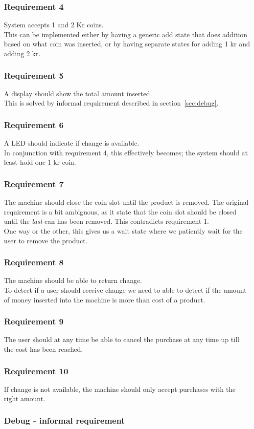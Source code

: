 \subsubsection*{Requirement 4}
System accepts 1 and 2 Kr coins.\\
This can be implemented either by having a generic add state that does addition based on what coin was inserted, or by having separate states for adding 1 kr and adding 2 kr.

\subsubsection*{Requirement 5}
A display should show the total amount inserted.\\
This is solved by informal requirement described in section~\ref{sec:debug}. 

\subsubsection*{Requirement 6}
A LED should indicate if change is available.\\
In conjunction with requirement 4, this effectively becomes; the system should at least hold one 1 kr coin. 

\subsubsection*{Requirement 7}
The machine should close the coin slot until the product is removed. The original requirement is a bit ambiguous, as it state that the coin slot should be closed until the \emph{last} can has been removed. This contradicts requirement 1.\\
One way or the other, this gives us a wait state where we patiently wait for the user to remove the product.

\subsubsection*{Requirement 8}
The machine should be able to return change.\\
To detect if a user should receive change we need to able to detect if the amount of money inserted into the machine is more than cost of a product.

\subsubsection*{Requirement 9}
The user should at any time be able to cancel the purchase at any time up till the cost has been reached.\\


\subsubsection*{Requirement 10}
If change is not available, the machine should only accept purchases with the right amount.\\

\subsubsection*{Debug - informal requirement}
\label{sec:debug}